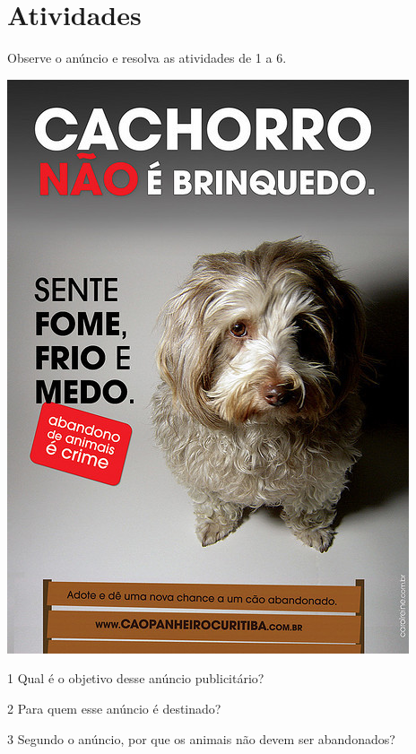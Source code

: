 \pagebreak
\section*{Atividades}

Observe o anúncio e resolva as atividades de 1 a 6.



\begin{center}
\includegraphics[width=.6\textwidth]{./media/image9.jpeg}
\end{center}

\num{1} Qual é o objetivo desse anúncio publicitário? 


\num{2} Para quem esse anúncio é destinado? 


\num{3} Segundo o anúncio, por que os animais não devem ser abandonados? 

